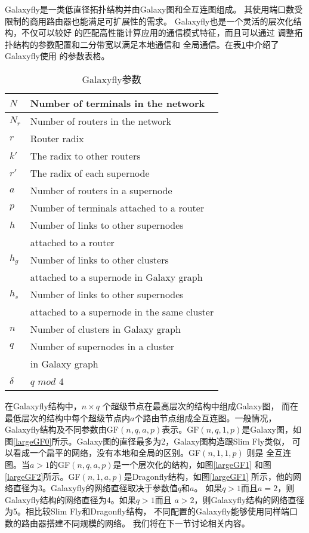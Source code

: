  Galaxyfly是一类低直径拓扑结构并由Galaxy图和全互连图组成。
 其使用端口数受限制的商用路由器也能满足可扩展性的需求。
 Galaxyfly也是一个灵活的层次化结构，不仅可以较好
 的匹配高性能计算应用的通信模式特征，而且可以通过
 调整拓扑结构的参数配置和二分带宽以满足本地通信和
 全局通信。在表\ref{Table1}中介绍了Galaxyfly使用
 的参数表格。

\begin{table}[t]
\centering
 \caption{Galaxyfly参数}
\begin{tabular}{l l}\hline
  \centering
  $N$ & Number of terminals in the network\\\hline
  $N_r$ & Number of routers in the network\\\hline
  $r$ & Router radix\\\hline
  $k'$ & The radix to other routers\\\hline
  $r'$ & The radix of each supernode\\\hline
  $a$	& Number of routers in a supernode\\\hline
  $p$	& Number of terminals attached to a router\\\hline
  $h$	& Number of links to other supernodes\\
        & attached to a router\\\hline
  $h_g$ & Number of links to other clusters \\
        & attached to a supernode in Galaxy graph\\\hline

  $h_s$ & Number of links to other supernodes \\
        & attached to a supernode in the same cluster\\\hline
  $n$	& Number of clusters in Galaxy graph\\\hline
  $q$	& Number of supernodes in a cluster \\
        & in Galaxy graph\\\hline
  $\delta$ & $q$ $mod$ $4$\\\hline

\end{tabular}

   \label{Table1}
\end{table}

在Galaxyfly结构中，$n\times q$ 个超级节点在最高层次的结构中组成Galaxy图，
而在最低层次的结构中每个超级节点内$a$个路由节点组成全互连图。一般情况，
Galaxyfly结构及不同参数由GF$(n,q,a,p)$表示。GF$(n,q,1,p)$是Galaxy图，如
图\ref{largeGF0}所示。Galaxy图的直径最多为2，Galaxy图构造跟Slim Fly类似，
可以看成一个扁平的网络，没有本地和全局的区别。GF$(n,1,1,p)$ 则是
全互连图。当$a>1$的GF$(n,q,a,p)$是一个层次化的结构，如图\ref{largeGF1}
和图\ref{largeGF2}所示。GF$(n,1,a,p)$是Dragonfly结构，如图\ref{largeGF1}
所示，他的网络直径为3。Galaxyfly的网络直径取决于参数值$q$和$a$。
如果$q>1$而且$a=2$，则Galaxyfly结构的网络直径为4。如果$q>1$而且
$a>2$，则Galaxyfly结构的网络直径为5。相比较Slim Fly和Dragonfly结构，
不同配置的Galaxyfly能够使用同样端口数的路由器搭建不同规模的网络。
我们将在下一节讨论相关内容。

